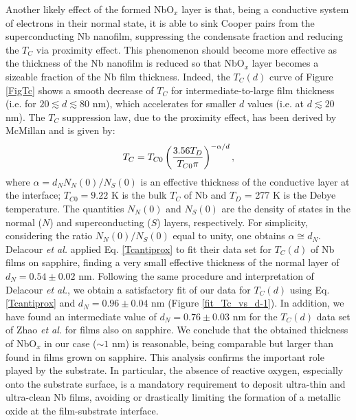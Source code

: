 \documentclass[reprint,onecolumn,superscriptaddress,a4paper,nofootinbib,floatfix]{revtex4-1}
\begin{document}
Another likely effect of the formed NbO$_x$ layer is that, being a conductive system of electrons in their normal state, it is able to sink Cooper pairs from the superconducting Nb nanofilm, suppressing the condensate fraction and reducing the $T_C$ via proximity effect. This phenomenon should become more effective as the thickness of the Nb nanofilm is reduced so that NbO$_x$ layer becomes a sizeable fraction of the Nb film thickness. Indeed, the $T_C(d)$ curve of Figure \ref{FigTc} shows a smooth decrease of $T_C$ for intermediate-to-large film thickness (i.e. for $20 \lesssim d \lesssim 80$ nm), which accelerates for smaller $d$ values (i.e. at $d \lesssim 20$ nm). The $T_C$ suppression law, due to the proximity effect, has been derived by McMillan\cite{McMillan} and is given by:
\begin{equation}
\centering
T_C = T_{C0}\left( \frac{3.56 T_D}{T_{C0}\pi} \right)^{-\alpha/d},
\label{Tcantiprox}
\end{equation}
where $\alpha = d_N N_N(0)/N_S(0)$ is an effective thickness of the conductive layer at the interface; $T_{C0} = 9.22$ K is the bulk $T_C$ of Nb and $T_D$ = 277 K is the Debye temperature. The quantities $N_N(0)$ and $N_S(0)$ are the density of states in the normal ($N$) and superconducting ($S$) layers, respectively. For simplicity, considering the ratio $N_N (0)/N_S (0)$ equal to unity, one obtains $\alpha \cong d_N$. Delacour \textit{et al.} \cite{Delacour} applied Eq. \eqref{Tcantiprox} to fit their data set for $T_C(d)$ of Nb films on sapphire, finding a very small effective thickness of the normal layer of $d_N = 0.54 \pm 0.02$ nm. Following the same procedure and interpretation of Delacour \textit{et al.}, we obtain a satisfactory fit of our data for $T_C(d)$ using Eq. \eqref{Tcantiprox} and $d_N = 0.96\pm 0.04$ nm (Figure \ref{fit_Tc_vs_d-1}). In addition, we have found an intermediate value of $d_N = 0.76\pm 0.03$ nm for the $T_C(d)$ data set of Zhao \textit{et al.}\cite{Zhao} for films also on sapphire. We conclude that the obtained thickness of NbO$_x$ in our case ($\sim 1$ nm) is reasonable, being comparable but larger than found in films grown on sapphire. This analysis confirms the important role played by the substrate. In particular, the absence of reactive oxygen, especially onto the substrate surface, is a mandatory requirement to deposit ultra-thin and ultra-clean Nb films, avoiding or drastically limiting the formation of a metallic oxide at the film-substrate interface.
\end{document}
